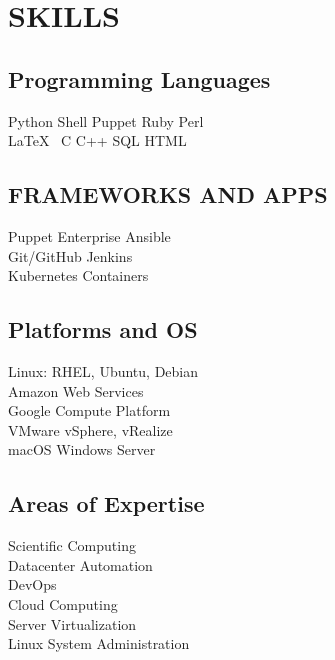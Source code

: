\documentclass[]{deedy-resume-openfont}
\begin{document}
\begin{minipage}[t]{0.33\textwidth}

\section{SKILLS}
\subsection{Programming Languages}
Python \textbullet{}   Shell \textbullet{} Puppet \textbullet{}
Ruby \textbullet{} Perl\\ 
\LaTeX\ \textbullet{} C \textbullet{} C++ \textbullet{} SQL \textbullet{} HTML
\sectionsep

\subsection{FRAMEWORKS AND APPS} 
    Puppet Enterprise \textbullet{} Ansible \\
    Git/GitHub \textbullet{} Jenkins \\
    Kubernetes \textbullet{} Containers
\sectionsep

\subsection{Platforms and OS}
    Linux: RHEL, Ubuntu, Debian\\
    Amazon Web Services \\
    Google Compute Platform\\
    VMware vSphere, vRealize\\
    macOS \textbullet{} Windows Server\\
\sectionsep
    
\subsection{Areas of Expertise}
	Scientific Computing\\
    Datacenter Automation\\
    DevOps\\
    Cloud Computing\\
    Server Virtualization\\
    Linux System Administration\\
%
%

\end{minipage}
\end{document}
